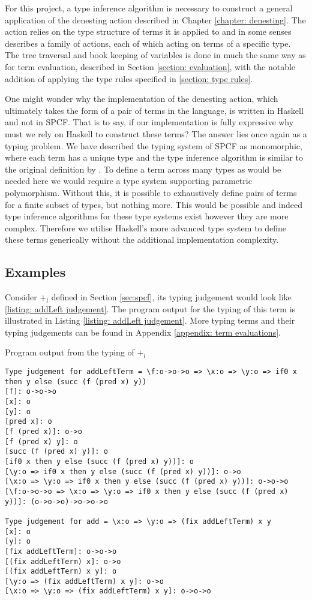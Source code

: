 \documentclass[12pt,a4paper]{report}
\theoremstyle{definition}
\theoremstyle{remark}
\begin{document}
For this project, a type inference algorithm is necessary to construct a general application of the denesting action described in Chapter \ref{chapter: denesting}. The action relies on the type structure of terms it is applied to and in some senses describes a family of actions, each of which acting on terms of a specific type. The tree traversal and book keeping of variables is done in much the same way as for term evaluation, described in Section \ref{section: evaluation}, with the notable addition of applying the type rules specified in \ref{section: type rules}.

One might wonder why the implementation of the denesting action, which ultimately takes the form of a pair of terms in the language, is written in Haskell and not in SPCF. That is to say, if our implementation is fully expressive why must we rely on Haskell to construct these terms? The answer lies once again as a typing problem. We have described the typing system of SPCF as monomorphic, where each term has a unique type and the type inference algorithm is similar to the original definition by \cite{curry1958combinatory}. To define a term across many types as would be needed here we would require a type system supporting parametric polymorphism. Without this, it is possible to exhaustively define pairs of terms for a finite subset of types, but nothing more. This would be possible and indeed type inference algorithms for these type systems exist \cite[\emph{e.g.},][]{hindley_1969, milner_1978} however they are more complex. Therefore we utilise Haskell's more advanced type system to define these terms generically without the additional implementation complexity. 

\subsection{Examples}
Consider $+_l$ defined in Section \ref{sec:spcf}, its typing judgement would look like \ref{listing: addLeft judgement}. The program output for the typing of this term is illustrated in Listing \ref{listing: addLeft judgement}. More typing terms and their typing judgements can be found in Appendix \ref{appendix: term evaluations}.
\begin{listing}
\caption{Program output from the typing of $+_l$}
\label{listing: addLeft judgement}
\begin{verbatim}
Type judgement for addLeftTerm = \f:o->o->o => \x:o => \y:o => if0 x then y else (succ (f (pred x) y))
[f]: o->o->o
[x]: o
[y]: o
[pred x]: o
[f (pred x)]: o->o
[f (pred x) y]: o
[succ (f (pred x) y)]: o
[if0 x then y else (succ (f (pred x) y))]: o
[\y:o => if0 x then y else (succ (f (pred x) y))]: o->o
[\x:o => \y:o => if0 x then y else (succ (f (pred x) y))]: o->o->o
[\f:o->o->o => \x:o => \y:o => if0 x then y else (succ (f (pred x) y))]: (o->o->o)->o->o->o

Type judgement for add = \x:o => \y:o => (fix addLeftTerm) x y
[x]: o
[y]: o
[fix addLeftTerm]: o->o->o
[(fix addLeftTerm) x]: o->o
[(fix addLeftTerm) x y]: o
[\y:o => (fix addLeftTerm) x y]: o->o
[\x:o => \y:o => (fix addLeftTerm) x y]: o->o->o
\end{verbatim}
\end{listing}
\end{document}
